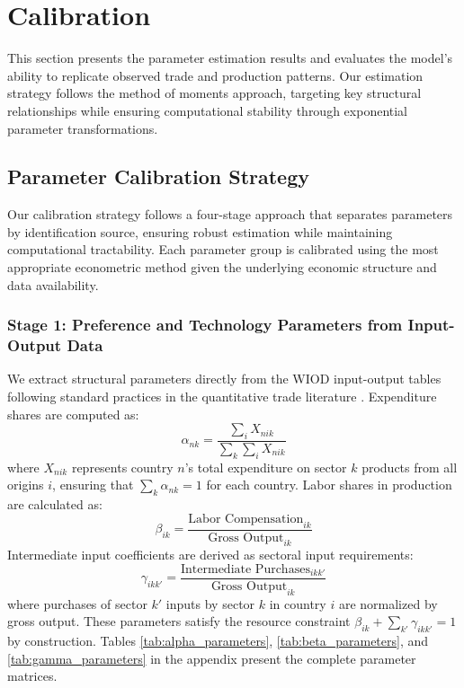 \section{Calibration}

This section presents the parameter estimation results and evaluates the model's ability to replicate observed trade and production patterns. Our estimation strategy follows the method of moments approach, targeting key structural relationships while ensuring computational stability through exponential parameter transformations.

\subsection{Parameter Calibration Strategy}

Our calibration strategy follows a four-stage approach that separates parameters by identification source, ensuring robust estimation while maintaining computational tractability. Each parameter group is calibrated using the most appropriate econometric method given the underlying economic structure and data availability.

\subsubsection{Stage 1: Preference and Technology Parameters from Input-Output Data}

We extract structural parameters directly from the WIOD input-output tables following standard practices in the quantitative trade literature \citep{costinot2012TheReviewofEconomicStudies}. Expenditure shares are computed as:
\begin{equation}
\alpha_{nk} = \frac{\sum_i X_{nik}}{\sum_k \sum_i X_{nik}}
\end{equation}
where $X_{nik}$ represents country $n$'s total expenditure on sector $k$ products from all origins $i$, ensuring that $\sum_k \alpha_{nk} = 1$ for each country. Labor shares in production are calculated as:
\begin{equation}
\beta_{ik} = \frac{\text{Labor Compensation}_{ik}}{\text{Gross Output}_{ik}}
\end{equation}
Intermediate input coefficients are derived as sectoral input requirements:
\begin{equation}
\gamma_{ikk'} = \frac{\text{Intermediate Purchases}_{ikk'}}{\text{Gross Output}_{ik}}
\end{equation}
where purchases of sector $k'$ inputs by sector $k$ in country $i$ are normalized by gross output. These parameters satisfy the resource constraint $\beta_{ik} + \sum_{k'} \gamma_{ikk'} = 1$ by construction. Tables \ref{tab:alpha_parameters}, \ref{tab:beta_parameters}, and \ref{tab:gamma_parameters} in the appendix present the complete parameter matrices.

